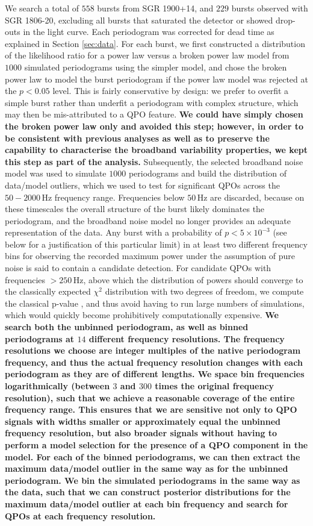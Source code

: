 \documentclass[numberedappendix]{emulateapj}
\newcommand{\hz}{\,\mathrm{Hz}}
\begin{document}
We search a total of $558$ bursts from SGR 1900+14, and $229$ bursts observed with SGR 1806-20, excluding all bursts that saturated the detector or showed drop-outs in the light curve. 
Each periodogram was corrected for dead time as explained in Section \ref{sec:data}. 
For each burst, we first constructed a distribution of the likelihood ratio for a power law versus a broken power law model from $1000$ simulated periodograms using the simpler model, and
chose the broken power law to model the burst periodogram if the power law model was rejected at the $p < 0.05$ level. This is fairly conservative by design: we prefer to overfit a simple burst rather than underfit a periodogram 
with complex structure, which may then be mis-attributed to a QPO feature. \textbf{We could have simply chosen the broken power law only and avoided this step; however, in order to be consistent with previous analyses \citep{huppenkothen2013,huppenkothen2014} as well as to preserve the capability to characterise the broadband variability properties, we kept this step as part of the analysis.}
Subsequently, the selected broadband noise model was used to simulate $1000$ periodograms and build the
distribution of data/model outliers, which we used to test for significant QPOs across the $50 - 2000 \hz$ frequency range. Frequencies below $50 \, \mathrm{Hz}$ are discarded, because on these timescales the overall structure of
the burst likely dominates the periodogram, and the broadband noise model no longer provides an adequate representation of the data. Any burst with a probability of $p < 5 \times 10^{-3}$ (see below for a justification of this particular limit) in at least two different frequency bins
for observing the recorded maximum power under the assumption of pure noise is said to contain a candidate detection. For candidate QPOs with frequencies $> 250 \hz$, above which the distribution of powers
should converge to the classically expected $\chi^2$ distribution with two degrees of freedom, we compute the classical p-value \citep{groth1975}, and thus avoid having to run large numbers of simulations, which 
would quickly become prohibitively computationally expensive. 
\textbf{We search both the unbinned periodogram, as well as binned periodograms at $14$ different frequency resolutions. The frequency resolutions we choose are integer multiples of the native periodogram frequency, and thus the actual frequency resolution changes with each periodogram as they are of different lengths. We space bin frequencies logarithmically (between $3$ and $300$ times the original frequency resolution), such that we achieve a reasonable coverage of the entire frequency range. This ensures that we are sensitive not only to QPO signals with widths smaller or approximately equal the unbinned frequency resolution, but also broader signals without having to perform a model selection for the presence of a QPO component in the model. For each of the binned periodograms, we can then extract the maximum data/model outlier in the same way as for the unbinned periodogram. We bin the simulated periodograms in the same way as the data, such that we can construct posterior distributions for the maximum data/model outlier at each bin frequency and search for QPOs at each frequency resolution.}
\end{document}
